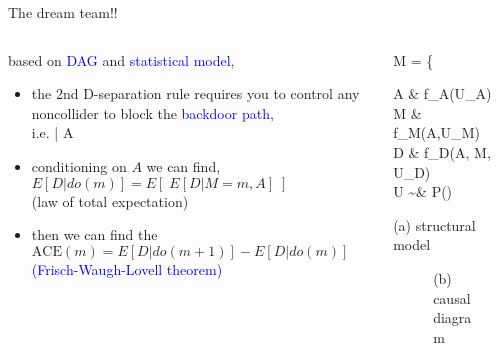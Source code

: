 \begin{frame}
	{The dream team!!}
	\begin{columns}
		\begin{column}{0.5\textwidth}
			based on \textcolor{blue}{DAG} and \textcolor{blue}{statistical model},
			\begin{itemize}
				\item the 2nd D-separation rule requires you to control any noncollider to block the \textcolor{blue}{backdoor path}, \\
				i.e.  \; | A \\
				\item conditioning on $A$ we can find, \\
				{\small $E[D | do(m)] = E[\; E[D | M=m, A] \;]$} \\
				{\small (law of total expectation)}
				\item then we can find the \\
				{\small $\text{ACE}(m) = E[D | do(m+1)] - E[D | do(m)]$ } \\
				{\small \textcolor{blue}{(Frisch-Waugh-Lovell theorem)} }
			\end{itemize}
		\end{column}
		\begin{column}{0.5\textwidth}  
			\begin{equ}
				M = \left\{ \begin{aligned} 
					A \leftarrow & \; f_{A}(U_{A}) \\
					M \leftarrow & \; f_{M}(A,U_{M}) \\
					D \leftarrow & \; f_{D}(A, M, U_{D}) \\
					U \sim & \; P()
				\end{aligned} \right
				\caption*{(a) structural model}
			\end{equ}
			\begin{figure}
				\caption*{(b) causal diagram}
			\end{figure}
		\end{column}
	\end{columns}
\end{frame}
